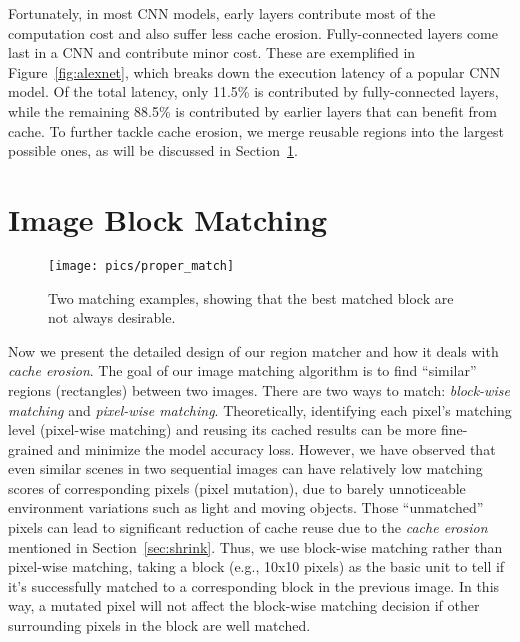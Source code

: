 \documentclass[10pt,acmtog]{acmart}
\newcommand{\shrink}{\emph{cache erosion}\xspace}
\begin{document}
Fortunately, in most CNN models, early layers contribute most of the computation cost and also suffer less cache erosion. 
Fully-connected layers come last in a CNN and contribute minor cost.
These are exemplified in Figure~\ref{fig:alexnet}, which breaks down the execution latency of a popular CNN model. 
Of the total latency, only 11.5\% is contributed by fully-connected layers, while the remaining 88.5\% is contributed by earlier layers that can benefit from cache. 
To further tackle cache erosion, we merge reusable regions into the largest possible ones, as will be discussed in Section~\ref{sec:matching}. 

% 

\section{Image Block Matching}\label{sec:matching}\begin{figure}[t]
	\centering
	\texttt{[image: pics/proper\_match]}
	\caption{Two matching examples, showing that the best matched block are not always desirable.}
	\label{fig:proper_match}
\end{figure}%
Now we present the detailed design of our region matcher and how it deals with \shrink.
The goal of our image matching algorithm is to find ``similar'' regions (rectangles) between two images.
There are two ways to match: \textit{block-wise matching} and \textit{pixel-wise matching}.
Theoretically, identifying each pixel's matching level (pixel-wise matching) and reusing its cached results can be more fine-grained and minimize the model accuracy loss.
However, we have observed that even similar scenes in two sequential images can have relatively low matching scores of corresponding pixels (pixel mutation), due to barely unnoticeable environment variations such as light and moving objects.
Those ``unmatched'' pixels can lead to significant reduction of cache reuse due to the \shrink mentioned in Section~\ref{sec:shrink}.
Thus, we use block-wise matching rather than pixel-wise matching, taking a block (e.g., 10x10 pixels) as the basic unit to tell if it's successfully matched to a corresponding block in the previous image.
In this way, a mutated pixel will not affect the block-wise matching decision if other surrounding pixels in the block are well matched.
\end{document}
